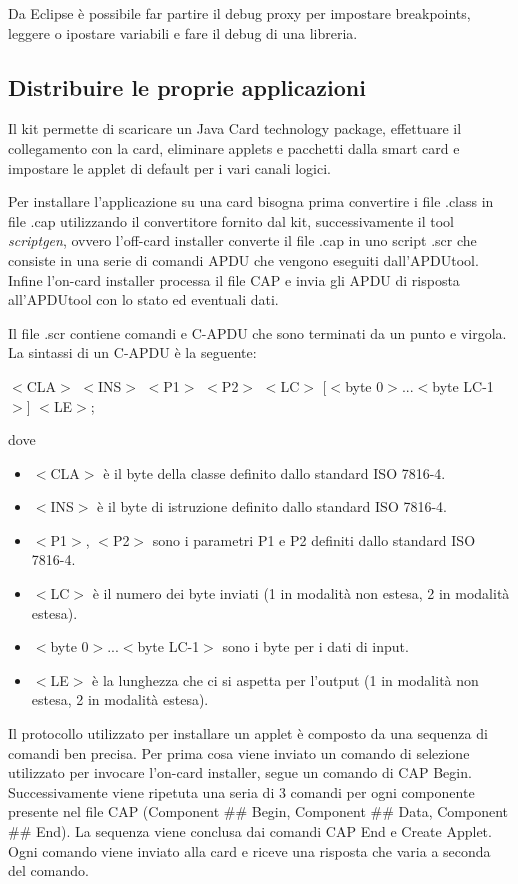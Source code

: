 Da Eclipse è possibile far partire il debug proxy per impostare breakpoints, leggere o ipostare variabili e fare il debug di una libreria.

\subsection{Distribuire le proprie applicazioni}
Il kit permette di scaricare un Java Card technology package, effettuare il collegamento con la card, eliminare applets e pacchetti dalla smart card e impostare le applet di default per i vari canali logici.

Per installare l'applicazione su una card bisogna prima convertire i file .class in file .cap utilizzando il convertitore fornito dal kit, successivamente il tool \textit{scriptgen}, ovvero l'off-card installer converte il file .cap in uno script .scr che consiste in una serie di comandi APDU che vengono eseguiti dall'APDUtool. Infine l'on-card installer processa il file CAP e invia gli APDU di risposta all'APDUtool con lo stato ed eventuali dati.

Il file .scr contiene comandi e C-APDU che sono terminati da un punto e virgola.
La sintassi di un C-APDU è la seguente:
\begin{center}
    $<$CLA$>$ $<$INS$>$ $<$P1$>$ $<$P2$>$ $<$LC$>$ [$<$byte 0$>$...$<$byte LC-1$>$] $<$LE$>$;
\end{center}
dove
\begin{itemize}
    \item $<$CLA$>$ è il byte della classe definito dallo standard ISO 7816-4.
    \item $<$INS$>$ è il byte di istruzione definito dallo standard ISO 7816-4.
    \item $<$P1$>$, $<$P2$>$ sono i parametri P1 e P2 definiti dallo standard ISO 7816-4.
    \item $<$LC$>$ è il numero dei byte inviati (1 in modalità non estesa, 2 in modalità estesa).
    \item $<$byte 0$>$...$<$byte LC-1$>$ sono i byte per i dati di input.
    \item $<$LE$>$ è la lunghezza che ci si aspetta per l'output (1 in modalità non estesa, 2 in modalità estesa).
\end{itemize}

Il protocollo utilizzato per installare un applet è composto da una sequenza di comandi ben precisa. Per prima cosa viene inviato un comando di selezione utilizzato per invocare l'on-card installer, segue un comando di CAP Begin. Successivamente viene ripetuta una seria di 3 comandi per ogni componente presente nel file CAP (Component \#\# Begin, Component \#\# Data, Component \#\# End). La sequenza viene conclusa dai comandi CAP End e Create Applet. Ogni comando viene inviato alla card e riceve una risposta che varia a seconda del comando.